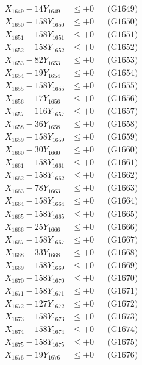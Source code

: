 \documentclass[a4paper,10pt]{article}
\begin{document}
{\begin{align}
X_{1649} - 14Y_{1649} &\leq +0 && \text{(G1649)} \\
X_{1650} - 158Y_{1650} &\leq +0 && \text{(G1650)} \\
\allowbreak
X_{1651} - 158Y_{1651} &\leq +0 && \text{(G1651)} \\
X_{1652} - 158Y_{1652} &\leq +0 && \text{(G1652)} \\
X_{1653} - 82Y_{1653} &\leq +0 && \text{(G1653)} \\
X_{1654} - 19Y_{1654} &\leq +0 && \text{(G1654)} \\
X_{1655} - 158Y_{1655} &\leq +0 && \text{(G1655)} \\
X_{1656} - 17Y_{1656} &\leq +0 && \text{(G1656)} \\
X_{1657} - 116Y_{1657} &\leq +0 && \text{(G1657)} \\
X_{1658} - 36Y_{1658} &\leq +0 && \text{(G1658)} \\
X_{1659} - 158Y_{1659} &\leq +0 && \text{(G1659)} \\
X_{1660} - 30Y_{1660} &\leq +0 && \text{(G1660)} \\
\allowbreak
X_{1661} - 158Y_{1661} &\leq +0 && \text{(G1661)} \\
X_{1662} - 158Y_{1662} &\leq +0 && \text{(G1662)} \\
X_{1663} - 78Y_{1663} &\leq +0 && \text{(G1663)} \\
X_{1664} - 158Y_{1664} &\leq +0 && \text{(G1664)} \\
X_{1665} - 158Y_{1665} &\leq +0 && \text{(G1665)} \\
X_{1666} - 25Y_{1666} &\leq +0 && \text{(G1666)} \\
X_{1667} - 158Y_{1667} &\leq +0 && \text{(G1667)} \\
X_{1668} - 33Y_{1668} &\leq +0 && \text{(G1668)} \\
X_{1669} - 158Y_{1669} &\leq +0 && \text{(G1669)} \\
X_{1670} - 158Y_{1670} &\leq +0 && \text{(G1670)} \\
\allowbreak
X_{1671} - 158Y_{1671} &\leq +0 && \text{(G1671)} \\
X_{1672} - 127Y_{1672} &\leq +0 && \text{(G1672)} \\
X_{1673} - 158Y_{1673} &\leq +0 && \text{(G1673)} \\
X_{1674} - 158Y_{1674} &\leq +0 && \text{(G1674)} \\
X_{1675} - 158Y_{1675} &\leq +0 && \text{(G1675)} \\
X_{1676} - 19Y_{1676} &\leq +0 && \text{(G1676)} \\

\end{align}}
\end{document}
